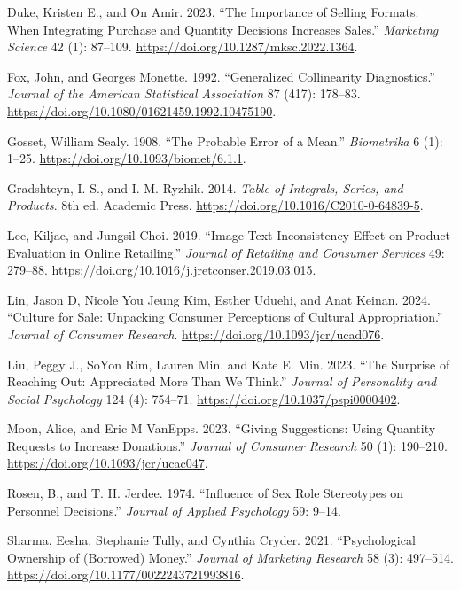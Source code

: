 \documentclass[
  11pt,
  letterpaper,
]{scrbook}
\newlength{\cslhangindent}
\newenvironment{CSLReferences}[2] %
 {\begin{list}{}{%
  \setlength{\itemindent}{0pt}
  \setlength{\leftmargin}{0pt}
  \setlength{\parsep}{0pt}
  \ifodd #1
   \setlength{\leftmargin}{\cslhangindent}
   \setlength{\itemindent}{-1\cslhangindent}
  \fi
  \setlength{\itemsep}{#2\baselineskip}}}
 {\end{list}}
\theoremstyle{plain}
\theoremstyle{plain}
\theoremstyle{definition}
\theoremstyle{definition}
\theoremstyle{remark}
\begin{document}
\begin{CSLReferences}{1}{0}
Duke, Kristen E., and On Amir. 2023. {``The Importance of Selling
Formats: When Integrating Purchase and Quantity Decisions Increases
Sales.''} \emph{Marketing Science} 42 (1): 87--109.
\url{https://doi.org/10.1287/mksc.2022.1364}.

Fox, John, and Georges Monette. 1992. {``Generalized Collinearity
Diagnostics.''} \emph{Journal of the American Statistical Association}
87 (417): 178--83. \url{https://doi.org/10.1080/01621459.1992.10475190}.

Gosset, William Sealy. 1908. {``The Probable Error of a Mean.''}
\emph{Biometrika} 6 (1): 1--25.
\url{https://doi.org/10.1093/biomet/6.1.1}.

Gradshteyn, I. S., and I. M. Ryzhik. 2014. \emph{Table of Integrals,
Series, and Products}. 8th ed. Academic Press.
\url{https://doi.org/10.1016/C2010-0-64839-5}.

Lee, Kiljae, and Jungsil Choi. 2019. {``Image-Text Inconsistency Effect
on Product Evaluation in Online Retailing.''} \emph{Journal of Retailing
and Consumer Services} 49: 279--88.
\url{https://doi.org/10.1016/j.jretconser.2019.03.015}.

Lin, Jason D, Nicole You Jeung Kim, Esther Uduehi, and Anat Keinan.
2024. {``Culture for Sale: Unpacking Consumer Perceptions of Cultural
Appropriation.''} \emph{Journal of Consumer Research}.
\url{https://doi.org/10.1093/jcr/ucad076}.

Liu, Peggy J., SoYon Rim, Lauren Min, and Kate E. Min. 2023. {``The
Surprise of Reaching Out: Appreciated More Than We Think.''}
\emph{Journal of Personality and Social Psychology} 124 (4): 754--71.
\url{https://doi.org/10.1037/pspi0000402}.

Moon, Alice, and Eric M VanEpps. 2023. {``Giving Suggestions: Using
Quantity Requests to Increase Donations.''} \emph{Journal of Consumer
Research} 50 (1): 190--210. \url{https://doi.org/10.1093/jcr/ucac047}.

Rosen, B., and T. H. Jerdee. 1974. {``Influence of Sex Role Stereotypes
on Personnel Decisions.''} \emph{Journal of Applied Psychology} 59:
9--14.

Sharma, Eesha, Stephanie Tully, and Cynthia Cryder. 2021.
{``Psychological Ownership of (Borrowed) Money.''} \emph{Journal of
Marketing Research} 58 (3): 497--514.
\url{https://doi.org/10.1177/0022243721993816}.


\end{CSLReferences}
\end{document}
